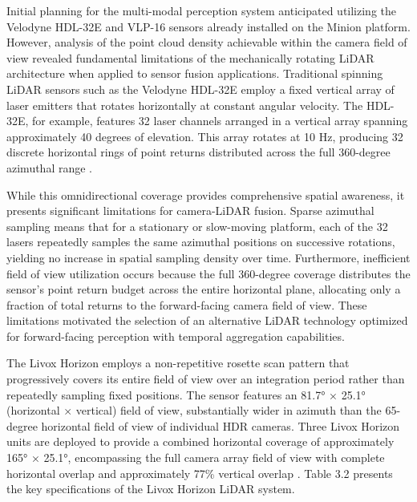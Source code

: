 \documentclass{erauthesis}
\begin{document}
Initial planning for the multi-modal perception system anticipated utilizing the Velodyne HDL-32E and VLP-16 sensors already installed on the Minion platform.
However, analysis of the point cloud density achievable within the camera field of view revealed fundamental limitations of the mechanically rotating \ac{LiDAR} architecture when applied to sensor fusion applications.
Traditional spinning \ac{LiDAR} sensors such as the Velodyne HDL-32E employ a fixed vertical array of laser emitters that rotates horizontally at constant angular velocity.
The HDL-32E, for example, features 32 laser channels arranged in a vertical array spanning approximately 40 degrees of elevation.
This array rotates at 10 Hz, producing 32 discrete horizontal rings of point returns distributed across the full 360-degree azimuthal range \cite{thompson2023}.

While this omnidirectional coverage provides comprehensive spatial awareness, it presents significant limitations for camera-\ac{LiDAR} fusion.
Sparse azimuthal sampling means that for a stationary or slow-moving platform, each of the 32 lasers repeatedly samples the same azimuthal positions on successive rotations, yielding no increase in spatial sampling density over time.
Furthermore, inefficient field of view utilization occurs because the full 360-degree coverage distributes the sensor's point return budget across the entire horizontal plane, allocating only a fraction of total returns to the forward-facing camera field of view.
These limitations motivated the selection of an alternative \ac{LiDAR} technology optimized for forward-facing perception with temporal aggregation capabilities.

The Livox Horizon employs a non-repetitive rosette scan pattern that progressively covers its entire field of view over an integration period rather than repeatedly sampling fixed positions.
The sensor features an 81.7° × 25.1° (horizontal × vertical) field of view, substantially wider in azimuth than the 65-degree horizontal field of view of individual \ac{HDR} cameras.
Three Livox Horizon units are deployed to provide a combined horizontal coverage of approximately 165° × 25.1°, encompassing the full camera array field of view with complete horizontal overlap and approximately 77\% vertical overlap \cite{thompson2023}.
Table 3.2 presents the key specifications of the Livox Horizon \ac{LiDAR} system.
\end{document}
